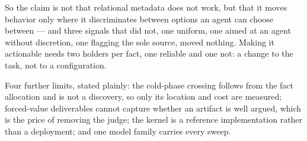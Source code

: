 So the claim is not that relational metadata does not work, but that it moves behavior
only where it discriminates between options an agent can choose between --- and three
signals that did not, one uniform, one aimed at an agent without discretion, one flagging
the sole source, moved nothing. Making it actionable needs two holders per fact, one
reliable and one not: a change to the task, not to a configuration.

Four further limits, stated plainly: the cold-phase crossing follows from the fact
allocation and is not a discovery, so only its location and cost are measured;
forced-value deliverables cannot capture whether an artifact is well argued, which is the
price of removing the judge; the kernel is a reference implementation rather than a
deployment; and one model family carries every sweep.
